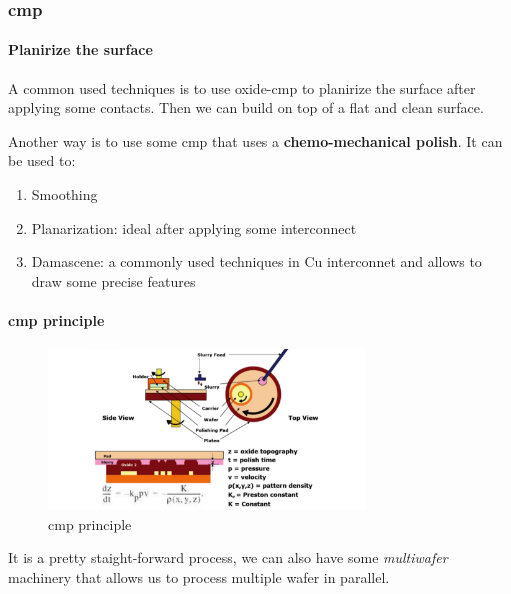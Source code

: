 \documentclass[
]{article}
\begin{document}
\hypertarget{cmp}{%
\subsubsection{\texorpdfstring{{cmp}}{cmp}}\label{cmp}}

\hypertarget{planirize-the-surface}{%
\paragraph{Planirize the surface}\label{planirize-the-surface}}

A common used techniques is to use oxide-{cmp} to planirize the surface
after applying some contacts. Then we can build on top of a flat and
clean surface.

Another way is to use some {cmp} that uses a \textbf{chemo-mechanical
polish}. It can be used to:

\begin{enumerate}
\def\labelenumi{\arabic{enumi}.}
\item
  Smoothing
\item
  Planarization: ideal after applying some interconnect
\item
  Damascene: a commonly used techniques in Cu interconnet and allows to
  draw some precise features
\end{enumerate}

\hypertarget{cmp-principle}{%
\paragraph{\texorpdfstring{{cmp}
principle}{cmp principle}}\label{cmp-principle}}

\begin{figure}
\hypertarget{fig:enter-label}{%
\centering
\includegraphics[width=0.75\textwidth,height=\textheight]{cmp_lucent.png}
\caption{{cmp} principle}\label{fig:enter-label}
}
\end{figure}

It is a pretty staight-forward process, we can also have some
\emph{multiwafer} machinery that allows us to process multiple wafer in
parallel.
\end{document}

